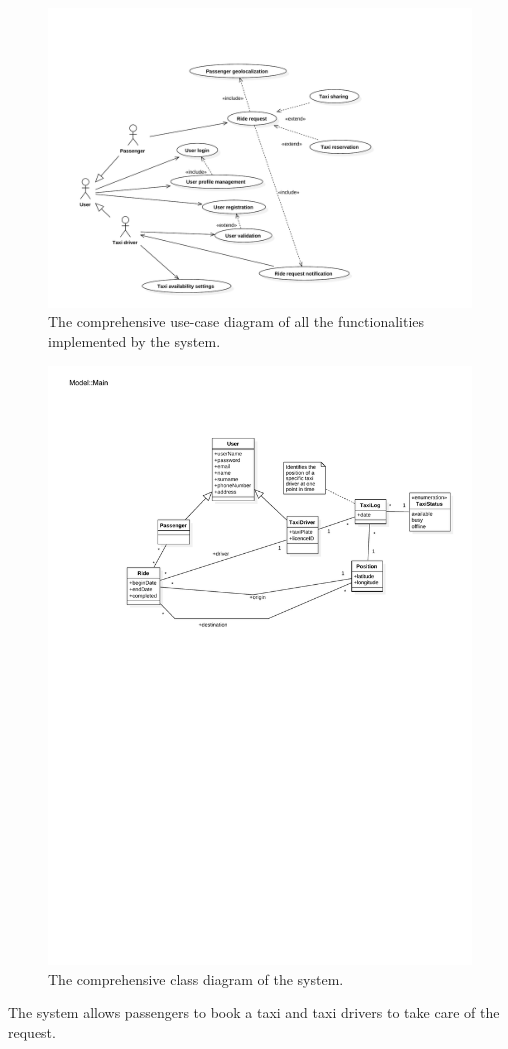 \begin{figure}
\includegraphics[width=\textwidth]{diagrams/usecase_whole.pdf}
\caption{The comprehensive use-case diagram of all the functionalities implemented by the system.}
\end{figure}

\begin{figure}
\includegraphics[width=\textwidth]{diagrams/general_class_diagram.pdf}
\caption{The comprehensive class diagram of the system.}
\end{figure}
The system allows passengers to book a taxi and taxi drivers to take care of the request.

